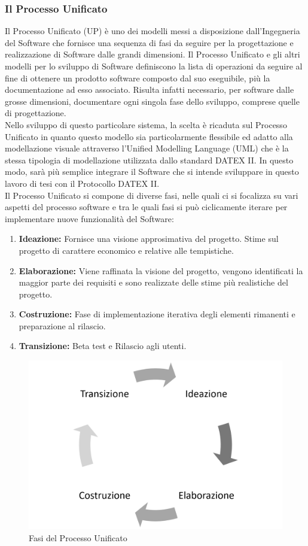 \subsubsection{Il Processo Unificato}
Il Processo Unificato (UP) è uno dei modelli messi a disposizione dall'Ingegneria del Software che fornisce una sequenza di fasi da seguire per la progettazione e realizzazione di Software dalle grandi dimensioni. Il Processo Unificato e gli altri modelli per lo sviluppo di Software definiscono la lista di operazioni da seguire al fine di ottenere un prodotto software composto dal suo eseguibile, più la documentazione ad esso associato. Risulta infatti necessario, per software dalle grosse dimensioni, documentare ogni singola fase dello sviluppo, comprese quelle di progettazione.\\
Nello sviluppo di questo particolare sistema, la scelta è ricaduta sul Processo Unificato in quanto questo modello sia particolarmente flessibile ed adatto alla modellazione visuale attraverso l'Unified Modelling Language (UML) che è la stessa tipologia di modellazione utilizzata dallo standard DATEX II. In questo modo, sarà più semplice integrare il Software che si intende sviluppare in questo lavoro di tesi con il Protocollo DATEX II.\\
Il Processo Unificato si compone di diverse fasi, nelle quali ci si focalizza su vari aspetti del processo software e tra le quali fasi si può ciclicamente iterare per implementare nuove funzionalità del Software:\\
\begin{enumerate}
	\item \textbf{Ideazione: } Fornisce una visione approsimativa del progetto. Stime sul progetto di carattere economico e relative alle tempistiche.
	\item \textbf{Elaborazione: } Viene raffinata la visione del progetto, vengono identificati la maggior parte dei requisiti e sono realizzate delle stime più realistiche del progetto.
	\item \textbf{Costruzione: } Fase di implementazione iterativa degli elementi rimanenti e preparazione al rilascio.
	\item \textbf{Transizione: } Beta test e Rilascio agli utenti.
\end{enumerate}
\begin{figure}
	\begin{center}
		\includegraphics[width=0.5\columnwidth]{images/up}
	\end{center}
	\caption{Fasi del Processo Unificato}
	\label{fig:up}
\end{figure}
